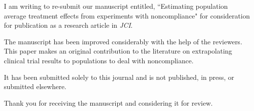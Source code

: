 \documentclass[11pt,stdletter,dateno]{newlfm}
\begin{document}
\begin{newlfm}

I am writing to re-submit our manuscript entitled, ``Estimating population average treatment effects from experiments with noncompliance" for consideration for publication as a research article in \textit{JCI}. 

The manuscript has been improved considerably with the help of the reviewers. This paper makes an original contribution to the literature on extrapolating clinical trial results to populations to deal with noncompliance. 

It has been submitted solely to this journal and is not published, in press, or submitted elsewhere.

Thank you for receiving the manuscript and considering it for review. 

\end{newlfm}
\end{document}
